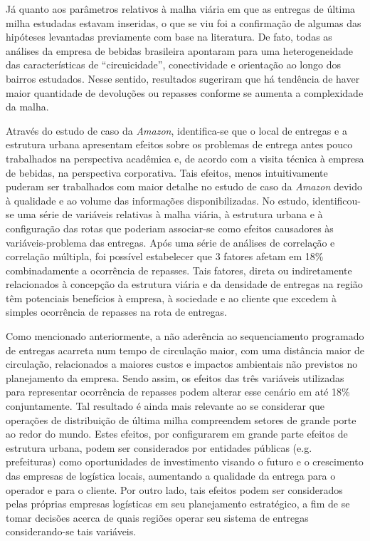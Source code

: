 Já quanto aos parâmetros relativos à malha viária em que as entregas de última milha estudadas estavam inseridas, o que se viu foi a confirmação de algumas das hipóteses levantadas previamente com base na literatura. 
De fato, todas as análises da empresa de bebidas brasileira apontaram para uma heterogeneidade das características de ``circuicidade'', conectividade e orientação ao longo dos bairros estudados.
Nesse sentido, resultados sugeriram que há tendência de haver maior quantidade de devoluções ou repasses conforme se aumenta a complexidade da malha.

Através do estudo de caso da \textit{Amazon}, identifica-se que o local de entregas e a estrutura urbana apresentam efeitos sobre os problemas de entrega antes pouco trabalhados na perspectiva acadêmica e, de acordo com a visita técnica à empresa de bebidas, na perspectiva corporativa.
%
Tais efeitos, menos intuitivamente puderam ser trabalhados com maior detalhe no estudo de caso da \textit{Amazon} devido à qualidade e ao volume das informações disponibilizadas. No estudo, identificou-se uma série de variáveis relativas à malha viária, à estrutura urbana e à configuração das rotas que poderiam associar-se como efeitos causadores às variáveis-problema das entregas. Após uma série de análises de correlação e correlação múltipla, foi possível estabelecer que 3 fatores afetam em 18\% combinadamente a ocorrência de repasses. Tais fatores, direta ou indiretamente relacionados à concepção da estrutura viária e da densidade de entregas na região têm potenciais benefícios à empresa, à sociedade e ao cliente que excedem à simples ocorrência de repasses na rota de entregas.

Como mencionado anteriormente, a não aderência ao sequenciamento programado de entregas acarreta num tempo de circulação maior, com uma distância maior de circulação, relacionados a maiores custos e impactos ambientais não previstos no planejamento da empresa. 
Sendo assim, os efeitos das três variáveis utilizadas para representar ocorrência de repasses podem alterar esse cenário em até 18\% conjuntamente.
Tal resultado é ainda mais relevante ao se considerar que operações de distribuição de última milha compreendem setores de grande porte ao redor do mundo.
%
Estes efeitos, por configurarem em grande parte efeitos de estrutura urbana, podem ser considerados por entidades públicas (e.g. prefeituras) como oportunidades de investimento visando o futuro e o crescimento das empresas de logística locais, aumentando a qualidade da entrega para o operador e para o cliente.
Por outro lado, tais efeitos podem ser considerados pelas próprias empresas logísticas em seu planejamento estratégico, a fim de se tomar decisões acerca de quais regiões operar seu sistema de entregas considerando-se tais variáveis.

